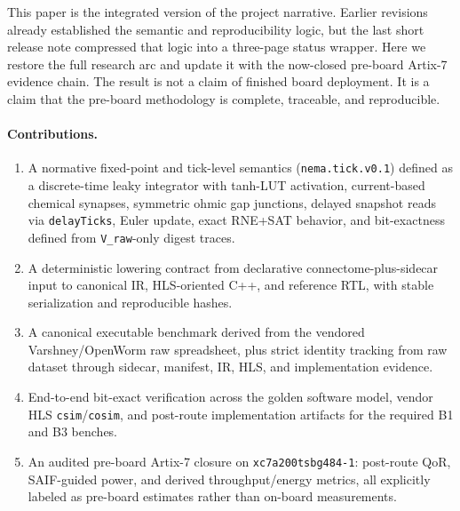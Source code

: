\documentclass[11pt]{article}
\begin{document}
This paper is the integrated version of the project narrative. Earlier revisions already established the semantic and reproducibility logic, but the last short release note compressed that logic into a three-page status wrapper. Here we restore the full research arc and update it with the now-closed pre-board Artix-7 evidence chain. The result is not a claim of finished board deployment. It is a claim that the pre-board methodology is complete, traceable, and reproducible.

\paragraph{Contributions.}
\begin{enumerate}[leftmargin=1.4em]
\item A normative fixed-point and tick-level semantics (\texttt{nema.tick.v0.1}) defined as a discrete-time leaky integrator with tanh-LUT activation, current-based chemical synapses, symmetric ohmic gap junctions, delayed snapshot reads via \texttt{delayTicks}, Euler update, exact RNE+SAT behavior, and bit-exactness defined from \texttt{V\_raw}-only digest traces.
\item A deterministic lowering contract from declarative connectome-plus-sidecar input to canonical IR, HLS-oriented C++, and reference RTL, with stable serialization and reproducible hashes.
\item A canonical executable benchmark derived from the vendored Varshney/OpenWorm raw spreadsheet, plus strict identity tracking from raw dataset through sidecar, manifest, IR, HLS, and implementation evidence.
\item End-to-end bit-exact verification across the golden software model, vendor HLS \texttt{csim}/\texttt{cosim}, and post-route implementation artifacts for the required B1 and B3 benches.
\item An audited pre-board Artix-7 closure on \texttt{xc7a200tsbg484-1}: post-route QoR, SAIF-guided power, and derived throughput/energy metrics, all explicitly labeled as pre-board estimates rather than on-board measurements.
\end{enumerate}
\end{document}
